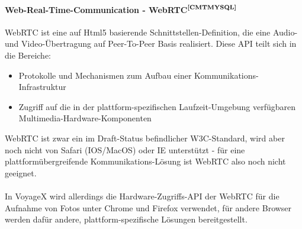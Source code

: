 \paragraph{Web-Real-Time-Communication - WebRTC$^{\textbf{\ref{CMTMYSQL}}}$}
\addtocounter{footnote}{1}%
WebRTC ist eine auf Html5 basierende Schnittstellen-Definition, die eine Audio- und Video-Übertragung auf Peer-To-Peer Basis realisiert. Diese API teilt sich in die Bereiche:
\begin{itemize}[leftmargin=*,noitemsep,topsep=1ex,parsep=0pt,partopsep=0pt]
\item Protokolle und Mechanismen zum Aufbau einer Kommunikations-Infrastruktur
\item Zugriff auf die in der plattform-spezifischen Laufzeit-Umgebung verfügbaren Multimedia-Hardware-Komponenten
\end{itemize}
WebRTC ist zwar ein im Draft-Status befindlicher W3C-Standard, wird aber noch nicht von Safari (IOS/MacOS) oder IE unterstützt - für eine plattformübergreifende Kommunikations-Lösung ist WebRTC also noch nicht geeignet.\\ \\
In VoyageX wird allerdings die Hardware-Zugriffs-API der WebRTC für die Aufnahme von Fotos unter Chrome und Firefox verwendet, für andere Browser werden dafür andere, plattform-spezifische Lösungen bereitgestellt.

